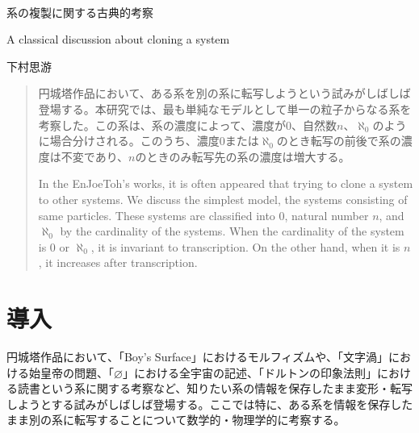 \documentclass[10pt, a5paper, twoside]{jsarticle}
\theoremstyle{definition}
\begin{document}
	{\Large 　} %

	\begin{center}

		\Large{系の複製に関する古典的考察}

		\vspace{3mm}

		\large{A classical discussion about cloning a system}

		\vspace{3mm}
		
		\large{下村思游}

	\end{center}

	\vspace{3mm}

	\begin{abstract}

		円城塔作品において、ある系を別の系に転写しようという試みがしばしば登場する。本研究では、最も単純なモデルとして単一の粒子からなる系を考察した。この系は、系の濃度によって、濃度が0、自然数$n$、$\aleph_0$のように場合分けされる。このうち、濃度0または$\aleph_0$のとき転写の前後で系の濃度は不変であり、$n$のときのみ転写先の系の濃度は増大する。


		\vspace{3mm}

		In the EnJoeToh's works, it is often appeared that trying to clone a system to other systems. We discuss the simplest model, the systems consisting of same particles. These systems are classified into 0, natural number $n$, and $\aleph_0$ by the cardinality of the systems. When the cardinality of the system is 0 or $\aleph_0$, it is invariant to transcription. On the other hand, when it is $n$, it increases after transcription.

	\end{abstract}

	\section{導入}

		円城塔作品において、「Boy's Surface」におけるモルフィズムや、「文字渦」における始皇帝の問題、「$\varnothing$」における全宇宙の記述、「ドルトンの印象法則」における読書という系に関する考察など、知りたい系の情報を保存したまま変形・転写しようとする試みがしばしば登場する。ここでは特に、ある系を情報を保存したまま別の系に転写することについて数学的・物理学的に考察する。
\end{document}
